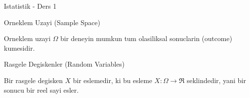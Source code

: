 \documentclass[12pt,fleqn]{article}
\begin{document}
Istatistik - Ders 1

Orneklem Uzayi (Sample Space)

Orneklem uzayi $\Omega$ bir deneyin mumkun tum olasiliksal sonuclarin
(outcome) kumesidir.

Rasgele Degiskenler (Random Variables)

Bir rasgele degisken $X$ bir eslemedir, ki bu esleme $X: \Omega \to \Re$
seklindedir, yani bir sonucu bir reel sayi esler. 
\end{document}
